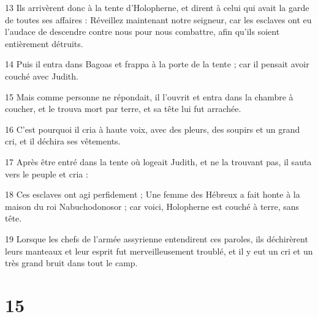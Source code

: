 \par 13 Ils arrivèrent donc à la tente d'Holopherne, et dirent à celui qui avait la garde de toutes ses affaires : Réveillez maintenant notre seigneur, car les esclaves ont eu l'audace de descendre contre nous pour nous combattre, afin qu'ils soient entièrement détruits.
\par 14 Puis il entra dans Bagoas et frappa à la porte de la tente ; car il pensait avoir couché avec Judith.
\par 15 Mais comme personne ne répondait, il l'ouvrit et entra dans la chambre à coucher, et le trouva mort par terre, et sa tête lui fut arrachée.
\par 16 C'est pourquoi il cria à haute voix, avec des pleurs, des soupirs et un grand cri, et il déchira ses vêtements.
\par 17 Après être entré dans la tente où logeait Judith, et ne la trouvant pas, il sauta vers le peuple et cria :
\par 18 Ces esclaves ont agi perfidement ; Une femme des Hébreux a fait honte à la maison du roi Nabuchodonosor ; car voici, Holopherne est couché à terre, sans tête.
\par 19 Lorsque les chefs de l'armée assyrienne entendirent ces paroles, ils déchirèrent leurs manteaux et leur esprit fut merveilleusement troublé, et il y eut un cri et un très grand bruit dans tout le camp.

\chapter{15}


